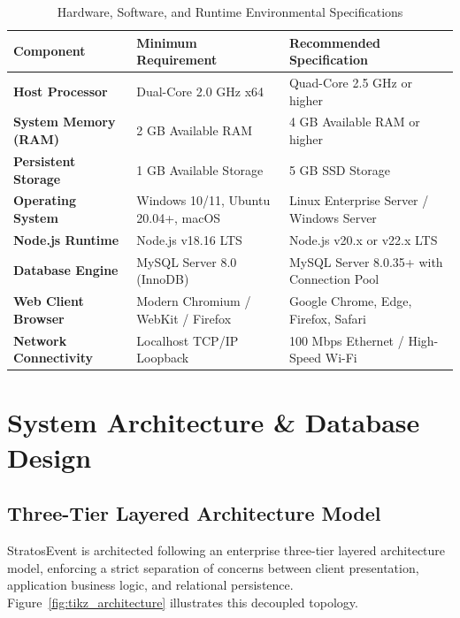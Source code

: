 \documentclass[11pt,a4paper]{report}
\begin{document}
\begin{table}[H]
\centering
\fontsize{9}{12}\selectfont
\renewcommand{\arraystretch}{1.35}
\setlength{\tabcolsep}{6pt}
\caption{Hardware, Software, and Runtime Environmental Specifications}
\label{tab:hardware_software}
\begin{tabularx}{\textwidth}{|p{}|p{}|X|}
\hline
\rowcolor{TCSBlue}
\color{white}\bfseries Component & 
\color{white}\bfseries Minimum Requirement & 
\color{white}\bfseries Recommended Specification \\\hline

\textbf{Host Processor} & Dual-Core 2.0 GHz x64 & Quad-Core 2.5 GHz or higher \\\hline
\textbf{System Memory (RAM)} & 2 GB Available RAM & 4 GB Available RAM or higher \\\hline
\textbf{Persistent Storage} & 1 GB Available Storage & 5 GB SSD Storage \\\hline
\textbf{Operating System} & Windows 10/11, Ubuntu 20.04+, macOS & Linux Enterprise Server / Windows Server \\\hline
\textbf{Node.js Runtime} & Node.js v18.16 LTS & Node.js v20.x or v22.x LTS \\\hline
\textbf{Database Engine} & MySQL Server 8.0 (InnoDB) & MySQL Server 8.0.35+ with Connection Pool \\\hline
\textbf{Web Client Browser} & Modern Chromium / WebKit / Firefox & Google Chrome, Edge, Firefox, Safari \\\hline
\textbf{Network Connectivity} & Localhost TCP/IP Loopback & 100 Mbps Ethernet / High-Speed Wi-Fi \\\hline
\end{tabularx}
\end{table}



\chapter{System Architecture \& Database Design}

\section{Three-Tier Layered Architecture Model}
\justifying
StratosEvent is architected following an enterprise three-tier layered architecture model, enforcing a strict separation of concerns between client presentation, application business logic, and relational persistence. Figure~\ref{fig:tikz_architecture} illustrates this decoupled topology.
\end{document}

